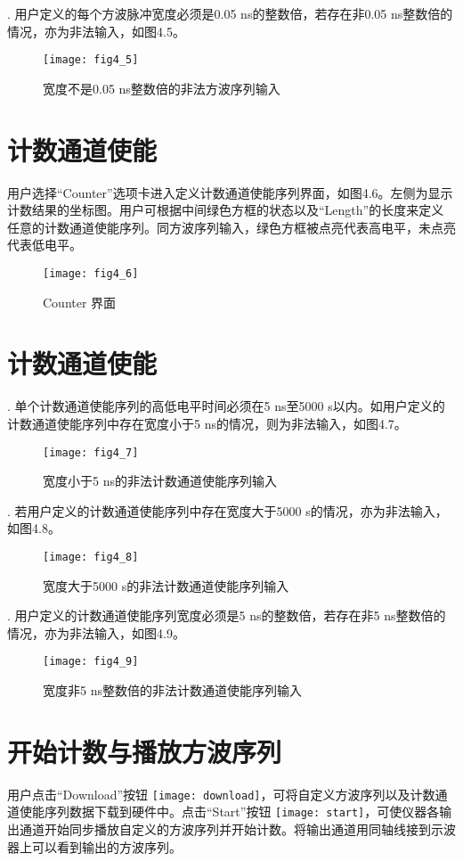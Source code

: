 . 用户定义的每个方波脉冲宽度必须是0.05 ns的整数倍，若存在非0.05 ns整数倍的情况，亦为非法输入，如图4.5。
\begin{figure}[H]
\centering
\texttt{[image: fig4\_5]}
\caption{宽度不是0.05 ns整数倍的非法方波序列输入}
\end{figure}

\section{计数通道使能}
用户选择“Counter”选项卡进入定义计数通道使能序列界面，如图4.6。左侧为显示计数结果的坐标图。用户可根据中间绿色方框的状态以及“Length”的长度来定义任意的计数通道使能序列。同方波序列输入，绿色方框被点亮代表高电平，未点亮代表低电平。
\begin{figure}[ht]
\centering
\texttt{[image: fig4\_6]}
\caption{Counter 界面}
\end{figure}

\section{计数通道使能}
. 单个计数通道使能序列的高低电平时间必须在5 ns至5000 s以内。如用户定义的计数通道使能序列中存在宽度小于5 ns的情况，则为非法输入，如图4.7。
\begin{figure}[ht]
\centering
\texttt{[image: fig4\_7]}
\caption{宽度小于5 ns的非法计数通道使能序列输入}
\end{figure}

\newpage
{}. 若用户定义的计数通道使能序列中存在宽度大于5000 s的情况，亦为非法输入，如图4.8。
\begin{figure}[ht]
\centering
\texttt{[image: fig4\_8]}
\caption{宽度大于5000 s的非法计数通道使能序列输入}
\end{figure}

. 用户定义的计数通道使能序列宽度必须是5 ns的整数倍，若存在非5 ns整数倍的情况，亦为非法输入，如图4.9。
\begin{figure}[ht]
\centering
\texttt{[image: fig4\_9]}
\caption{宽度非5 ns整数倍的非法计数通道使能序列输入}
\end{figure}

\section{\heiti 开始计数与播放方波序列}
用户点击“Download”按钮
\texttt{[image: download]}，可将自定义方波序列以及计数通道使能序列数据下载到硬件中。点击“Start”按钮
\texttt{[image: start]}，可使仪器各输出通道开始同步播放自定义的方波序列并开始计数。将输出通道用同轴线接到示波器上可以看到输出的方波序列。

